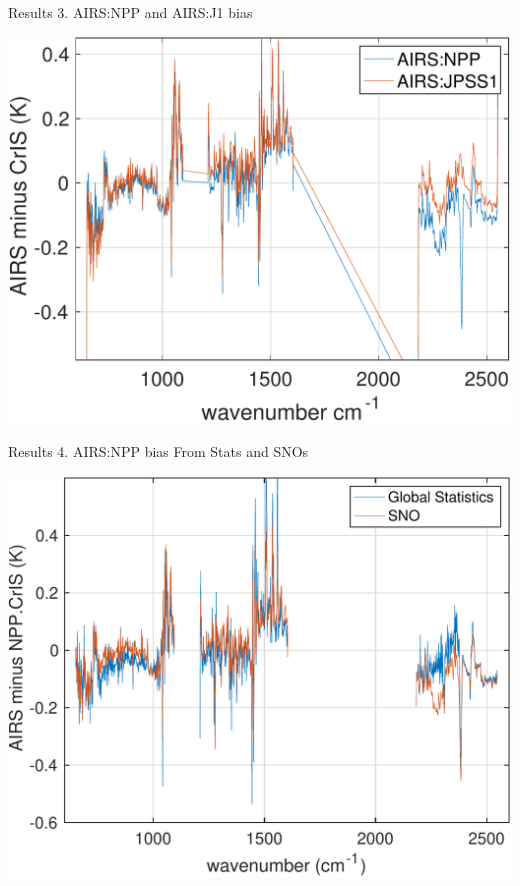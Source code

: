 \documentclass[10pt,t]{beamer}
\begin{document}
\begin{frame}{Results 3. AIRS:NPP and AIRS:J1 bias}

\vspace{-0.1in}
\begin{block}{}
  \begin{center}
    \includegraphics[width=0.6\linewidth]{./Figs/2018d060_2019d059_ac1_ac2_sno_mean_bias.pdf}
  \end{center}
\end{block}
    
\end{frame}

\begin{frame}{Results 4. AIRS:NPP bias From Stats and SNOs}

  \begin{center}
    \includegraphics[width=0.65\linewidth]{./Figs/2018d060_2019d059_airs_npp_ac1_bias_stats_sno_v2.pdf}
  \end{center}
    
\end{frame}
\end{document}
